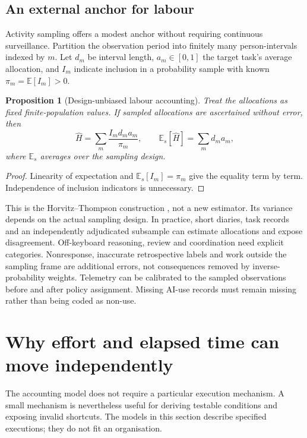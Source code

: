 \documentclass[11pt,a4paper]{amsart}
\newtheorem{proposition}{Proposition}[section]
\theoremstyle{definition}
\theoremstyle{remark}
\newcommand{\E}{\mathbb E}
\begin{document}
\subsection{An external anchor for labour}

Activity sampling offers a modest anchor without requiring continuous surveillance. Partition the observation period into finitely many person-intervals indexed by $m$. Let $d_m$ be interval length, $a_m\in[0,1]$ the target task's average allocation, and $I_m$ indicate inclusion in a probability sample with known $\pi_m=\E[I_m]>0$.

\begin{proposition}[Design-unbiased labour accounting]
\label{prop:sampling}
Treat the allocations as fixed finite-population values. If sampled allocations are ascertained without error, then
\begin{equation}
\label{eq:ht}
 \widehat H=\sum_m \frac{I_m d_ma_m}{\pi_m},
 \qquad \E_{\!s}[\widehat H]=\sum_m d_ma_m,
\end{equation}
where $\E_s$ averages over the sampling design.
\end{proposition}

\begin{proof}
Linearity of expectation and $\E_s[I_m]=\pi_m$ give the equality term by term. Independence of inclusion indicators is unnecessary.
\end{proof}

This is the Horvitz--Thompson construction \cite{horvitz1952}, not a new estimator. Its variance depends on the actual sampling design. In practice, short diaries, task records and an independently adjudicated subsample can estimate allocations and expose disagreement. Off-keyboard reasoning, review and coordination need explicit categories. Nonresponse, inaccurate retrospective labels and work outside the sampling frame are additional errors, not consequences removed by inverse-probability weights. Telemetry can be calibrated to the sampled observations before and after policy assignment. Missing AI-use records must remain missing rather than being coded as non-use.

\section{Why effort and elapsed time can move independently}
\label{sec:mechanisms}

The accounting model does not require a particular execution mechanism. A small mechanism is nevertheless useful for deriving testable conditions and exposing invalid shortcuts. The models in this section describe specified executions; they do not fit an organisation.
\end{document}
